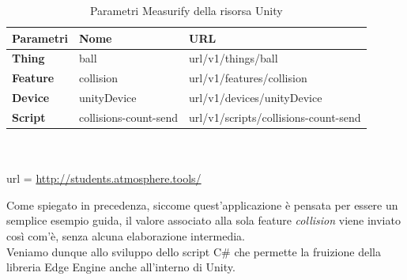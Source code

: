 \begin{table}[H]
	\begin{tabular}{|p{}|p{}|p{}|}
		\hline
		\textbf{Parametri} & \textbf{Nome} & \textbf{URL}\\
		\hline
		\textbf{Thing} & ball & {{url}}/v1/things/ball\\
		\hline
		\textbf{Feature} & collision & {{url}}/v1/features/collision\\
		\hline
		\textbf{Device} & unityDevice & {{url}}/v1/devices/unityDevice\\	
		\hline
		\textbf{Script} & collisions-count-send & {{url}}/v1/scripts/collisions-count-send\\	
		\hline
	\end{tabular}
	\\\\url = \url{http://students.atmosphere.tools/}
	\caption{Parametri Measurify della risorsa Unity}
	\label{descunitydev}
\end{table}
Come spiegato in precedenza, siccome quest'applicazione è pensata per essere un semplice esempio guida, il valore associato alla sola feature \textit{collision} viene inviato così com'è, senza alcuna elaborazione intermedia.\\
Veniamo dunque allo sviluppo dello script C\# che permette la fruizione della libreria Edge Engine anche all'interno di Unity.  

